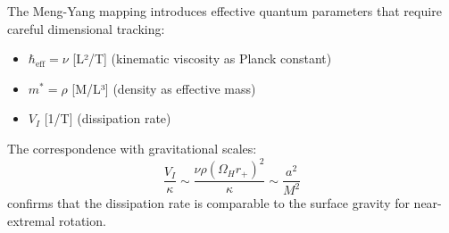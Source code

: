 \documentclass[11pt]{article}
\begin{document}
The Meng-Yang mapping introduces effective quantum parameters that require careful dimensional tracking:
\begin{itemize}
\item $\hbar_{\text{eff}} = \nu$ [L²/T] (kinematic viscosity as Planck constant)
\item $m^* = \rho$ [M/L³] (density as effective mass)
\item $V_I$ [1/T] (dissipation rate)
\end{itemize}

The correspondence with gravitational scales:
\begin{equation}
\frac{V_I}{\kappa} \sim \frac{\nu\rho(\Omega_H r_+)^2}{\kappa} \sim \frac{a^2}{M^2}
\end{equation}
confirms that the dissipation rate is comparable to the surface gravity for near-extremal rotation.
\end{document}
